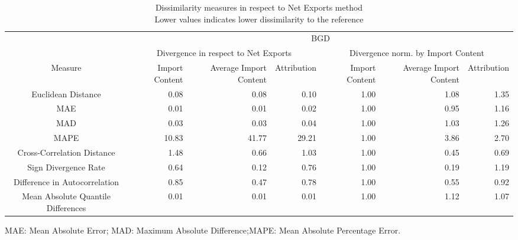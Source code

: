 \begin{table}[t]
\caption*{
{\large Dissimilarity measures in respect to Net Exports method} \\ 
{\small Lower values indicates lower dissimilarity to the reference}
} 
\fontsize{15.0pt}{18.0pt}\selectfont
\begin{tabular*}{\linewidth}{@{\extracolsep{\fill}}crrrrrr}
\toprule
 & \multicolumn{6}{c}{BGD} \\ 
\cmidrule(lr){2-7}
 & \multicolumn{3}{c}{Divergence in respect to Net Exports} & \multicolumn{3}{c}{Divergence norm. by Import Content} \\ 
\cmidrule(lr){2-4} \cmidrule(lr){5-7}
Measure & Import Content & Average Import Content & Attribution & Import Content & Average Import Content & Attribution \\ 
\midrule\addlinespace[2.5pt]
Euclidean Distance & 0.08 & 0.08 & 0.10 & 1.00 & 1.08 & 1.35 \\ 
MAE & 0.01 & 0.01 & 0.02 & 1.00 & 0.95 & 1.16 \\ 
MAD & 0.03 & 0.03 & 0.04 & 1.00 & 1.03 & 1.26 \\ 
MAPE & 10.83 & 41.77 & 29.21 & 1.00 & 3.86 & 2.70 \\ 
Cross-Correlation Distance & 1.48 & 0.66 & 1.03 & 1.00 & 0.45 & 0.69 \\ 
Sign Divergence Rate & 0.64 & 0.12 & 0.76 & 1.00 & 0.19 & 1.19 \\ 
Difference in Autocorrelation & 0.85 & 0.47 & 0.78 & 1.00 & 0.55 & 0.92 \\ 
Mean Absolute Quantile Differences & 0.01 & 0.01 & 0.01 & 1.00 & 1.12 & 1.07 \\ 
\bottomrule
\end{tabular*}
\begin{minipage}{\linewidth}
MAE: Mean Absolute Error; MAD: Maximum Absolute Difference;MAPE: Mean Absolute Percentage Error.\\
\end{minipage}
\end{table}

